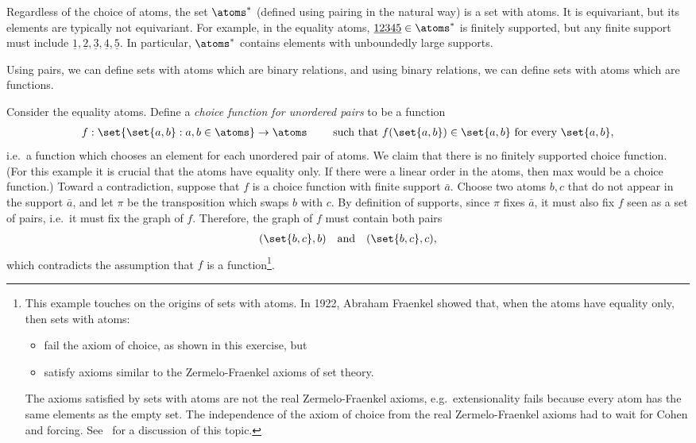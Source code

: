 \begin{myexample} Regardless of the choice of atoms, the set $\atoms^*$ (defined using pairing in the natural way) is a set with atoms. It is equivariant, but its elements are typically not equivariant. For example, in the equality atoms, $\underline{12345} \in \atoms^*$ is finitely supported, but any finite support must include $\underline 1, \underline 2, \underline 3, \underline 4, \underline 5$. In particular, $\atoms^*$ contains elements with unboundedly large supports.
\end{myexample}

Using pairs, we can define sets with atoms which are binary relations, and using binary relations, we can define sets with atoms which are functions.


\begin{myexample}\label{ex:choice}
	Consider the equality atoms. Define a \emph{choice function for unordered pairs} to be a function
	\begin{align*}
		f : \set{ \set{a,b} : a,b \in \atoms} \to \atoms \qquad \text{ such that }f(\set{a,b}) \in \set{a,b} \text{ for every $\set{a,b}$},
	\end{align*}
	i.e.~a function which chooses an element for each unordered pair of atoms. 
	 We claim that there is no finitely supported choice function. 	 (For this example it is crucial that the atoms have equality only. If there were a linear order in the atoms, then max would be a choice function.) Toward a contradiction, suppose that $f$ is a choice function with finite support $\bar a$. Choose two atoms $b,c$ that do not appear in the support $\bar a$, and let $\pi$ be the transposition which swaps $b$ with $c$. By definition of supports, since $\pi$ fixes $\bar a$, it must also fix $f$ seen as a set of pairs, i.e.~it must fix the graph of $f$. Therefore, the graph of $f$ must contain both pairs
\begin{align*}
	(\set{b,c},b) \quad\text{and} \quad (\set{b,c},c),
\end{align*}
which contradicts the assumption that $f$ is a function\footnote{
	This example touches on the origins of sets with atoms. In 1922, Abraham Fraenkel showed that, when the atoms have equality only, then sets with atoms:
\begin{itemize}
		\item fail the axiom of choice, as shown in this exercise, but
	\item satisfy axioms similar to the Zermelo-Fraenkel axioms of set theory.
\end{itemize}
The axioms satisfied by sets with atoms are not the real Zermelo-Fraenkel axioms, e.g.~extensionality fails because every atom has the same elements as the empty set. The independence of the axiom of choice from the real Zermelo-Fraenkel axioms had to wait for Cohen and forcing. See~\cite{sep-axiom-choice} for a discussion of this topic.}.
\end{myexample}


